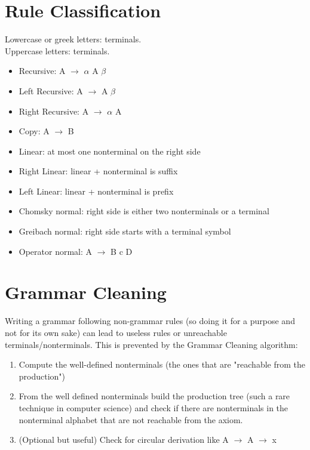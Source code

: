 	\section{Rule Classification}
	    Lowercase or greek letters: terminals.\\
	    Uppercase letters: terminals.
	    \begin{itemize}
	        \item Recursive: A $\rightarrow$ $\alpha$ A $\beta$ 
	        \item Left Recursive: A $\rightarrow$ A $\beta$ 
	        \item Right Recursive: A $\rightarrow$ $\alpha$ A
	        \item Copy: A $\rightarrow$ B
	        \item Linear: at most one nonterminal on the right side
	        \item Right Linear: linear + nonterminal is suffix
	        \item Left Linear: linear + nonterminal is prefix
	        \item Chomsky normal: right side is either two nonterminals or a terminal
	        \item Greibach normal: right side starts with a terminal symbol
	        \item Operator normal: A $\rightarrow$ B c D
	    \end{itemize}
    
    \section{Grammar Cleaning}
        Writing a grammar following non-grammar rules (so doing it for a purpose and not for its own sake) can lead to useless rules or unreachable terminals/nonterminals. This is prevented by the Grammar Cleaning algorithm:
            \begin{enumerate}
                \item Compute the well-defined nonterminals (the ones that are "reachable from the production")
                \item From the well defined nonterminals build the production tree (such a rare technique in computer science) and check if there are nonterminals in the nonterminal alphabet that are not reachable from the axiom.
                \item (Optional but useful) Check for circular derivation like A $\rightarrow$ A $\rightarrow$ x
            \end{enumerate}
    
